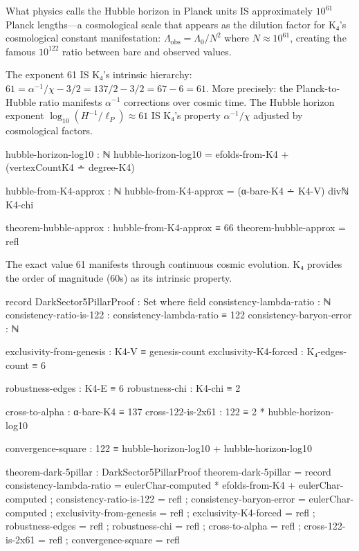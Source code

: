 \documentclass[11pt,a4paper]{book}
\begin{document}
What physics calls the Hubble horizon in Planck units IS approximately $10^{61}$ Planck lengths—a cosmological scale that appears as the dilution factor for K₄'s cosmological constant manifestation: 
$\Lambda_{\text{obs}} = \Lambda_0 / N^2$ where $N \approx 10^{61}$, creating the famous $10^{122}$ ratio between bare and observed values.

The exponent 61 IS K₄'s intrinsic hierarchy: $61 = \alpha^{-1}/\chi - 3/2 = 137/2 - 3/2 = 67 - 6 = 61$.
More precisely: the Planck-to-Hubble ratio manifests $\alpha^{-1}$ corrections over cosmic time.
The Hubble horizon exponent $\log_{10}(H^{-1}/\ell_P) \approx 61$ IS K₄'s property $\alpha^{-1}/\chi$ adjusted by cosmological factors.

\begin{code}
hubble-horizon-log10 : ℕ
hubble-horizon-log10 = efolds-from-K4 + (vertexCountK4 ∸ degree-K4)

hubble-from-K4-approx : ℕ
hubble-from-K4-approx = (α-bare-K4 ∸ K4-V) divℕ K4-chi

theorem-hubble-approx : hubble-from-K4-approx ≡ 66
theorem-hubble-approx = refl
\end{code}

The exact value 61 manifests through continuous cosmic evolution. K₄ provides the order of magnitude (60s) as its intrinsic property.

\begin{code}
record DarkSector5PillarProof : Set where
  field
    consistency-lambda-ratio : ℕ
    consistency-ratio-is-122 : consistency-lambda-ratio ≡ 122
    consistency-baryon-error : ℕ
    
    exclusivity-from-genesis : K4-V ≡ genesis-count
    exclusivity-K4-forced : K₄-edges-count ≡ 6
    
    robustness-edges : K4-E ≡ 6
    robustness-chi : K4-chi ≡ 2
    
    cross-to-alpha : α-bare-K4 ≡ 137
    cross-122-is-2x61 : 122 ≡ 2 * hubble-horizon-log10
    
    convergence-square : 122 ≡ hubble-horizon-log10 + hubble-horizon-log10

theorem-dark-5pillar : DarkSector5PillarProof
theorem-dark-5pillar = record
  { consistency-lambda-ratio = eulerChar-computed * efolds-from-K4 + eulerChar-computed
  ; consistency-ratio-is-122 = refl
  ; consistency-baryon-error = eulerChar-computed
  ; exclusivity-from-genesis = refl
  ; exclusivity-K4-forced = refl
  ; robustness-edges = refl
  ; robustness-chi = refl
  ; cross-to-alpha = refl
  ; cross-122-is-2x61 = refl
  ; convergence-square = refl
  }
\end{code}
\end{document}
